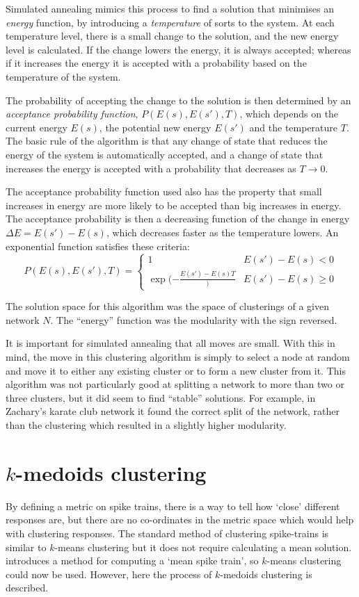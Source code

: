 Simulated annealing mimics this process to find a solution that minimises an \emph{energy} function, by introducing a \emph{temperature} of sorts to the system. At each temperature level, there is a small change to the solution, and the new energy level is calculated.  If the change lowers the energy, it is always accepted; whereas if it increases the energy it is accepted with a probability based on the temperature of the system.

The probability of accepting the change to the solution is then determined by an \emph{acceptance probability function}, $P(E(s),E(s'),T)$, which depends on the current energy $E(s)$, the potential new energy $E(s')$ and the temperature $T$.  The basic rule of the algorithm is that any change of state that reduces the energy of the system is automatically accepted, and a change of state that increases the energy is accepted with a probability that decreases as $T\rightarrow0$.

The acceptance probability function used also has the property that small increases in energy are more likely to be accepted than big increases in energy.  The acceptance probability is then a decreasing function of the change in energy $\Delta E = E(s')-E(s)$, which decreases faster as the temperature lowers.  An exponential function satisfies these criteria:
\begin{equation}
P(E(s),E(s'),T) = \left\{ \begin{array}{ll} 1 & E(s')-E(s)<0 \\ \exp(-\frac{E(s')-E(s){T}}) & E(s') - E(s)\geq 0 \end{array} \right.
\end{equation}

The solution space for this algorithm was the space of clusterings of a given network $N$.  The ``energy'' function was the modularity with the sign reversed.

It is important for simulated annealing that all moves are small.  With this in mind, the move in this clustering algorithm is simply to select a node at random and move it to either any existing cluster or to form a new cluster from it.  This algorithm was not particularly good at splitting a network to more than two or three clusters, but it did seem to find ``stable'' solutions. For example, in Zachary's karate club network \citep{Zachary1977a} it found the correct split of the network, rather than the clustering which resulted in a slightly higher modularity. 


\section{$k$-medoids clustering}
By defining a metric on spike trains, there is a way to tell how \lq{}close\rq{} different responses are, but there are no co-ordinates in the metric space which 
would help with clustering responses.  The standard method of clustering 
spike-trains is similar to $k$-means clustering but it does not require calculating a mean solution. \citep{JulienneHoughton2012a} introduces a method for computing a \lq{}mean spike train\rq{}, so $k$-means clustering could now be used.  However, here the process of $k$-medoids clustering is described.

